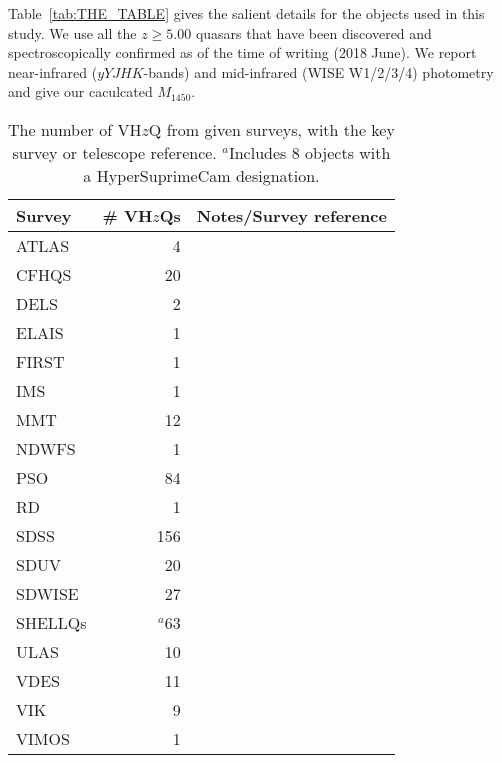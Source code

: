 \documentclass[usenatbib]{mnras}
\begin{document}
Table~\ref{tab:THE_TABLE} gives the salient details for the objects
used in this study. We use all the $z\geq5.00$ quasars that
have been discovered and spectroscopically confirmed as of the time of
writing (2018 June). We report near-infrared ($yYJHK$-bands)
and mid-infrared (WISE W1/2/3/4) photometry and give our caculcated 
$M_{1450}$. 

\begin{table}
\begin{tabular}{l r l}
\hline  \hline
Survey   & \# VH$z$Qs & Notes/Survey reference  \\
\hline  
  ATLAS      &     4    &  \citet{Shanks2015} \\
  CFHQS     &   20    &  \citet{Willott2007} \\
  DELS        &     2    &  \citet{Dey2018} \\
  ELAIS       &     1    &  \citet{Vaisanen2000} \\
  FIRST       &     1    &  \citet{Becker1995} \\
  IMS          &     1     &  \citet{Kim2015} \\
  MMT        &   12    &  \citet{McGreer2013} \\
  NDWFS    &     1     &  \citet{JD1999} \\
  PSO          &   84    &   \citet{Kaiser2002, Kaiser2010} \\
  RD           &     1       &  \cite{Mahabal2005} \\
  SDSS        & 156       & \citet{EDR} \\
  SDUV       &   20       & \citet{Yang2017} \\
  SDWISE    &   27    &     \citet{Wang2016} \\
  SHELLQs  &  $^{a}$63   &  \citet{Matsuoka2016}\\  %
  ULAS       &   10   & \citet{Lawrence2007} \\
  VDES       &   11   &  \citet{Reed2017} \\
  VIK          &     9   &  \citet{Edge2013} \\
  VIMOS     &     1   &  \citet{LeFevre2003} \\
\hline  \hline
\end{tabular}
\caption{The number of VH$z$Q from given surveys, with the key survey or telescope reference. 
$^{a}$Includes 8 objects with a HyperSuprimeCam \citep[HSC; ][]{Miyazaki2018}  
designation.
}
      \label{tab:surveys}
\end{table}
\end{document}
